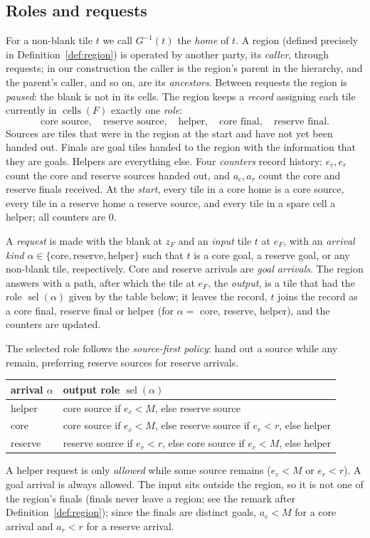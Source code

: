 \documentclass[11pt]{amsart}
\theoremstyle{definition}
\newcommand{\cells}{\operatorname{cells}}
\newcommand{\sel}{\operatorname{sel}}
\begin{document}
\subsection{Roles and requests}
For a non-blank tile $t$ we call $G^{-1}(t)$ the \emph{home} of $t$.
A region (defined precisely in Definition~\ref{def:region}) is operated by another party, its \emph{caller}, through
requests; in our construction the caller is the region's parent in the hierarchy, and the parent's caller, and so on, are its
\emph{ancestors}. Between requests the region
is \emph{paused}: the blank is not in its cells. The region keeps a \emph{record}
assigning each tile currently in $\cells(F)$ exactly one \emph{role}:
\[
\text{core source},\quad\text{reserve source},\quad\text{helper},\quad\text{core final},\quad\text{reserve final}.
\]
Sources are tiles that were in the region at the start and have not yet been handed out.
Finals are goal tiles handed to the region with the information that they are goals.
Helpers are everything else. Four \emph{counters} record history: $e_c,e_r$ count the core and reserve
sources handed out, and $a_c,a_r$ count the core and reserve finals received.
At the \emph{start}, every tile in a core home is a core source, every tile in a reserve home a reserve source, and every
tile in a spare cell a helper; all counters are $0$.

A \emph{request} is made with the blank at $z_F$ and an \emph{input} tile $t$ at $e_F$,
with an \emph{arrival kind} $\alpha\in\{\text{core},\text{reserve},\text{helper}\}$ such that
$t$ is a core goal, a reserve goal, or any non-blank tile, respectively. Core and reserve arrivals are
\emph{goal arrivals}. The region answers with a path, after which the tile at $e_F$, the \emph{output},
is a tile that had the role $\sel(\alpha)$ given by the table below; it leaves the record, $t$ joins the record
as a core final, reserve final or helper (for $\alpha=$ core, reserve, helper), and the counters are updated.

The selected role follows the \emph{source-first policy}: hand out a source while
any remain, preferring reserve sources for reserve arrivals.
\begin{center}
\begin{tabular}{l|l}
arrival $\alpha$ & output role $\sel(\alpha)$ \\\hline
helper & core source if $e_c<M$, else reserve source\\
core & core source if $e_c<M$, else reserve source if $e_r<r$, else helper\\
reserve & reserve source if $e_r<r$, else core source if $e_c<M$, else helper
\end{tabular}
\end{center}
A helper request is only \emph{allowed} while some source remains ($e_c<M$ or $e_r<r$).
A goal arrival is always allowed. The input sits outside the region, so it is not one of the region's
finals (finals never leave a region; see the remark after Definition~\ref{def:region}); since the finals are distinct goals, $a_c<M$ for a core arrival and $a_r<r$ for a reserve arrival.
\end{document}
